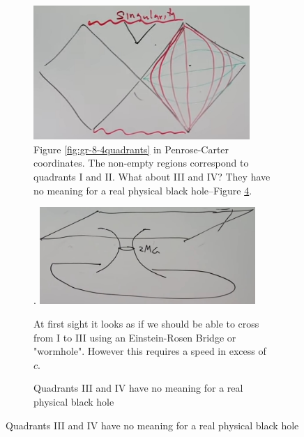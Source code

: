 \documentclass[]{article}
\begin{document}
{\begin{figure}[H]
	\begin{center}
		\caption{A black hole in Penrose-Carter Coordinates.}
		\begin{subfigure}[t]{0.3\textwidth}
			\caption{ Figure \ref{fig:gr-8-4quadrants} in Penrose-Carter coordinates. The non-empty regions correspond to quadrants I and II. What about III and IV? They have no meaning for a real physical black hole--Figure \ref{fig:gr-8-penrose-carter-black-hole-physical}.}\label{fig:gr-8-penrose-carter-black-hole}
			\includegraphics[width=0.9\textwidth]{gr-8-penrose-carter-black-hole}
		\end{subfigure}
		\;
		\begin{subfigure}[t]{0.3\textwidth}
			\caption{At first sight it looks as if we should be able to cross from I to III using an Einstein-Rosen Bridge or "wormhole". However this requires a speed in excess of $c$.}\label{fig:gr-8-einstein-rosen-bridge}.
			\includegraphics[width=0.9\textwidth]{gr-8-einstein-rosen-bridge}
		\end{subfigure}
		\;
		\begin{subfigure}[t]{0.3\textwidth}
			\caption{Quadrants III and IV have no meaning for a real physical black hole}\label{fig:gr-8-penrose-carter-black-hole-physical}

\end{subfigure}
\end{center}
\end{figure}}
\end{document}
